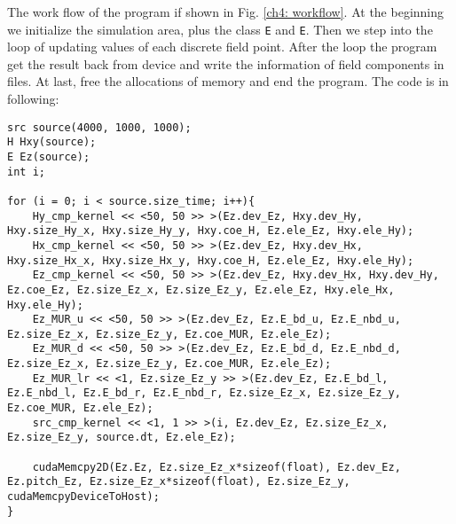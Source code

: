 The work flow of the program if shown in Fig. \ref{ch4: workflow}. At the beginning we initialize the simulation area, plus the class \lstinline|E| and \lstinline|E|. Then we step into the loop of updating values of each discrete field point. After the loop the program get the result back from device and write the information of field components in files. At last, free the allocations of memory and end the program. The code is in following:
\begin{lstlisting}
src source(4000, 1000, 1000);
H Hxy(source);
E Ez(source);
int i;

for (i = 0; i < source.size_time; i++){
	Hy_cmp_kernel << <50, 50 >> >(Ez.dev_Ez, Hxy.dev_Hy, Hxy.size_Hy_x, Hxy.size_Hy_y, Hxy.coe_H, Ez.ele_Ez, Hxy.ele_Hy);
	Hx_cmp_kernel << <50, 50 >> >(Ez.dev_Ez, Hxy.dev_Hx, Hxy.size_Hx_x, Hxy.size_Hx_y, Hxy.coe_H, Ez.ele_Ez, Hxy.ele_Hy);
	Ez_cmp_kernel << <50, 50 >> >(Ez.dev_Ez, Hxy.dev_Hx, Hxy.dev_Hy, Ez.coe_Ez, Ez.size_Ez_x, Ez.size_Ez_y, Ez.ele_Ez, Hxy.ele_Hx, Hxy.ele_Hy);
	Ez_MUR_u << <50, 50 >> >(Ez.dev_Ez, Ez.E_bd_u, Ez.E_nbd_u, Ez.size_Ez_x, Ez.size_Ez_y, Ez.coe_MUR, Ez.ele_Ez);
	Ez_MUR_d << <50, 50 >> >(Ez.dev_Ez, Ez.E_bd_d, Ez.E_nbd_d, Ez.size_Ez_x, Ez.size_Ez_y, Ez.coe_MUR, Ez.ele_Ez);
	Ez_MUR_lr << <1, Ez.size_Ez_y >> >(Ez.dev_Ez, Ez.E_bd_l, Ez.E_nbd_l, Ez.E_bd_r, Ez.E_nbd_r, Ez.size_Ez_x, Ez.size_Ez_y, Ez.coe_MUR, Ez.ele_Ez);
	src_cmp_kernel << <1, 1 >> >(i, Ez.dev_Ez, Ez.size_Ez_x, Ez.size_Ez_y, source.dt, Ez.ele_Ez);

	cudaMemcpy2D(Ez.Ez, Ez.size_Ez_x*sizeof(float), Ez.dev_Ez, Ez.pitch_Ez, Ez.size_Ez_x*sizeof(float), Ez.size_Ez_y, cudaMemcpyDeviceToHost);
}
\end{lstlisting}

